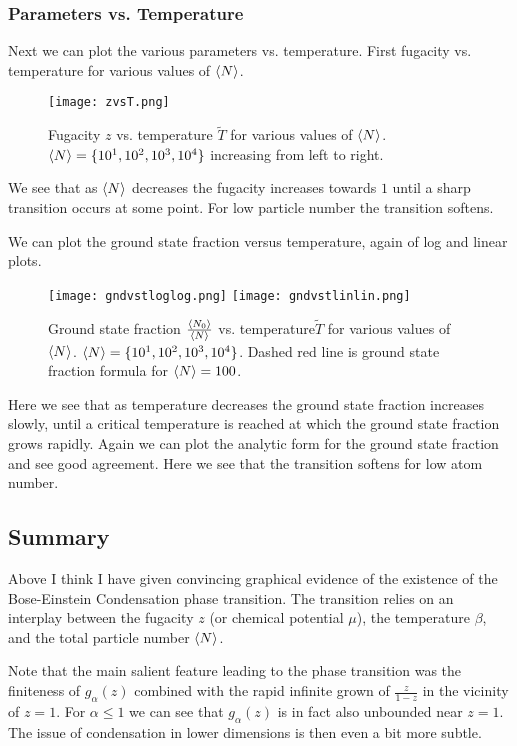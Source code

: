 \documentclass[12pt]{article}
\begin{document}
\subsubsection{Parameters vs. Temperature}

Next we can plot the various parameters vs. temperature. First fugacity vs. temperature for various values of $\Braket{N}$.

\begin{figure}[h]
\texttt{[image: zvsT.png]}
\caption{Fugacity $z$ vs. temperature $\tilde{T}$ for various values of $\Braket{N}$. $\Braket{N} = \{10^1, 10^2, 10^3, 10^4\}$ increasing from left to right.}
\end{figure}

We see that as $\Braket{N}$ decreases the fugacity increases towards $1$ until a sharp transition occurs at some point. For low particle number the transition softens.

We can plot the ground state fraction versus temperature, again of log and linear plots.

\newpage

\begin{figure}[h]
\texttt{[image: gndvstloglog.png]}
\texttt{[image: gndvstlinlin.png]}
\caption{Ground state fraction $\frac{\Braket{N_0}}{\Braket{N}}$ vs. temperature$\tilde{T}$ for various values of $\Braket{N}$. $\Braket{N}=\{10^1, 10^2, 10^3, 10^4\}$. Dashed red line is ground state fraction formula for $\Braket{N}=100$.}
\end{figure}

Here we see that as temperature decreases the ground state fraction increases slowly, until a critical temperature is reached at which the ground state fraction grows rapidly. Again we can plot the analytic form for the ground state fraction and see good agreement. Here we see that the transition softens for low atom number.

\subsection{Summary}

Above I think I have given convincing graphical evidence of the existence of the Bose-Einstein Condensation phase transition. The transition relies on an interplay between the fugacity $z$ (or chemical potential $\mu$), the temperature $\beta$, and the total particle number $\Braket{N}$.

Note that the main salient feature leading to the phase transition was the finiteness of $g_{\alpha}(z)$ combined with the rapid infinite grown of $\frac{z}{1-z}$ in the vicinity of $z=1$. For $\alpha \le 1$ we can see that $g_{\alpha}(z)$ is in fact also unbounded near $z=1$. The issue of condensation in lower dimensions is then even a bit more subtle.
\end{document}
